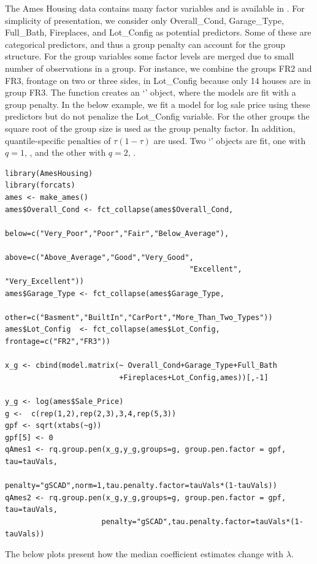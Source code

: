 The Ames Housing data contains many factor variables and is available in . For simplicity of presentation, we consider only Overall\_Cond, Garage\_Type, Full\_Bath, Fireplaces, and Lot\_Config as potential predictors. Some of these are categorical predictors, and thus a group penalty can account for the group structure. For the group variables some factor levels are merged due to small number of observations in a group. For instance, we combine the groups FR2 and FR3, frontage on two or three sides, in Lot\_Config because only 14 houses are in group FR3. The function  creates an `' object, where the models are fit with a group penalty. In the below example, we fit a model for log sale price using these predictors but do not penalize the Lot\_Config variable. For the other groups the square root of the group size is used as the group penalty factor. In addition, quantile-specific penalties of \(\tau(1-\tau)\) are used. Two `' objects are fit, one with \(q=1\), , and the other with \(q=2\), .

\begin{verbatim}
library(AmesHousing)
library(forcats)
ames <- make_ames()
ames$Overall_Cond <- fct_collapse(ames$Overall_Cond,
                                  below=c("Very_Poor","Poor","Fair","Below_Average"),
                                  above=c("Above_Average","Good","Very_Good",
                                          "Excellent", "Very_Excellent"))
ames$Garage_Type <- fct_collapse(ames$Garage_Type,
                      other=c("Basment","BuiltIn","CarPort","More_Than_Two_Types"))
ames$Lot_Config  <- fct_collapse(ames$Lot_Config, frontage=c("FR2","FR3"))

x_g <- cbind(model.matrix(~ Overall_Cond+Garage_Type+Full_Bath
                          +Fireplaces+Lot_Config,ames))[,-1]

y_g <- log(ames$Sale_Price)
g <-  c(rep(1,2),rep(2,3),3,4,rep(5,3))
gpf <- sqrt(xtabs(~g))
gpf[5] <- 0
qAmes1 <- rq.group.pen(x_g,y_g,groups=g, group.pen.factor = gpf, tau=tauVals,
                      penalty="gSCAD",norm=1,tau.penalty.factor=tauVals*(1-tauVals))
qAmes2 <- rq.group.pen(x_g,y_g,groups=g, group.pen.factor = gpf, tau=tauVals,
                      penalty="gSCAD",tau.penalty.factor=tauVals*(1-tauVals))
\end{verbatim}

The below plots present how the median coefficient estimates change with \(\lambda\).

